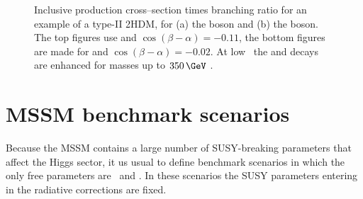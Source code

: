 \begin{figure}[h!]
\begin{center}
\end{center}
\caption[Inclusive production cross--section times branching ratio for an example of a type-II 2HDM, for the \PHiggs and \PHiggsps boson.]{Inclusive production cross--section times branching ratio for an example
of a type-II \ac{2HDM}, for (a) the \PHiggs boson and (b) the \PHiggsps boson. The
top figures use  and $\cos{(\beta-\alpha)}=-0.11$, the bottom
figures are made for  and $\cos{(\beta-\alpha)}=-0.02$. At low \tanb~the \Htohh and
\AtoZh decays are enhanced for masses up to $350\,\GeV$ \cite{2HDM-II}.}
\label{fig:2hdm_Hxsbr}
\end{figure}


\section{MSSM benchmark scenarios}
\label{sec:theory_BSM_models}
Because the MSSM contains a large number of
SUSY-breaking parameters that affect the Higgs
sector, it us usual to define benchmark scenarios 
in which the only free parameters are \mA~and \tanb.
In these scenarios the SUSY parameters entering in 
the radiative corrections are fixed.

